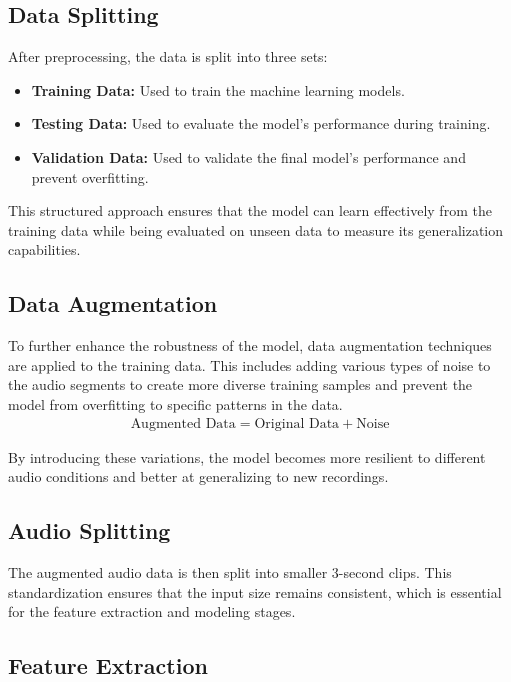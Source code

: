 \subsection{Data Splitting}

After preprocessing, the data is split into three sets:
\begin{itemize}
    \item \textbf{Training Data:} Used to train the machine learning models.
    \item \textbf{Testing Data:} Used to evaluate the model's performance during training.
    \item \textbf{Validation Data:} Used to validate the final model's performance and prevent overfitting.
\end{itemize}

This structured approach ensures that the model can learn effectively from the training data while being evaluated on unseen data to measure its generalization capabilities.

\subsection{Data Augmentation}

To further enhance the robustness of the model, data augmentation techniques are applied to the training data. This includes adding various types of noise to the audio segments to create more diverse training samples and prevent the model from overfitting to specific patterns in the data.
\begin{eqnarray}
    \text{Augmented Data} = \text{Original Data} + \text{Noise} 
\end{eqnarray}

By introducing these variations, the model becomes more resilient to different audio conditions and better at generalizing to new recordings.

\subsection{Audio Splitting}

The augmented audio data is then split into smaller 3-second clips. This standardization ensures that the input size remains consistent, which is essential for the feature extraction and modeling stages.

\subsection{Feature Extraction}

